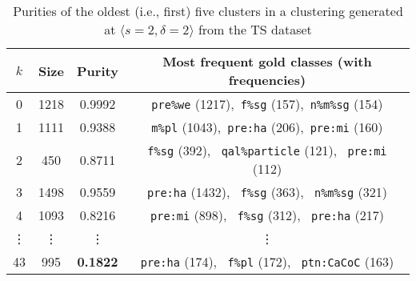\begin{table}[t]
\centering
\setlength{\extrarowheight}{6pt}
\begin{tabular}{cccc}
\toprule
$k$ &  Size & Purity & Most frequent gold classes (with frequencies) \\
\midrule
0 & 1218 & 0.9992 & \texttt{pre\%we} (1217),\, \texttt{f\%sg} (157), \,\texttt{n\%m\%sg} (154) \\
1 & 1111 & 0.9388 & \texttt{m\%pl} (1043), \,\texttt{pre:ha} (206), \,\texttt{pre:mi} (160) \\
2 & 450 & 0.8711 & \texttt{f\%sg} (392), \, \texttt{qal\%particle} (121), \, \texttt{pre:mi} (112) \\
3 & 1498 & 0.9559 & \texttt{pre:ha} (1432), \, \texttt{f\%sg} (363), \, \texttt{n\%m\%sg} (321) \\
4 & 1093 & 0.8216 & \texttt{pre:mi} (898), \, \texttt{f\%sg} (312), \, \texttt{pre:ha} (217) \\
\vdots & \vdots & \vdots & \vdots \\
43 & 995 & \textbf{0.1822} & \texttt{pre:ha} (174), \, \texttt{f\%pl}  (172), \, \texttt{ptn:CaCoC} (163) \\
\bottomrule
\end{tabular}
\caption{Purities of the oldest (i.e., first) five clusters in a clustering generated at $\langle{s} = 2, \delta = 2\rangle$ from the TS dataset}
\label{tab:best-purities}
\end{table}

